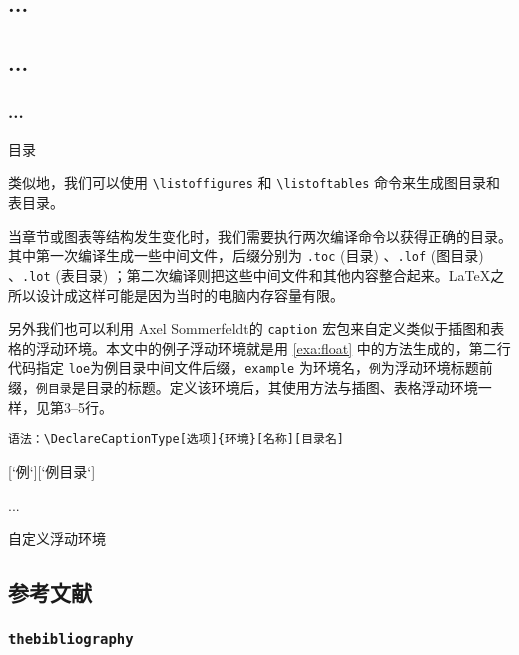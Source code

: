 \begin{example}[!h]
\begin{Code}[]
\tableofcontents
\setcounter{tocdepth}{2}
\chapter*{...}
\section*{...}
\subsection*{...}
\end{Code}
\caption{目录}
\label{exa:toc}
\end{example}

类似地，我们可以使用 \verb|\listoffigures| 和 \verb|\listoftables| 命令来生成图目录和表目录。

当章节或图表等结构发生变化时，我们需要执行两次编译命令以获得正确的目录。其中第一次编译生成一些中间文件，后缀分别为 \texttt{.toc} (目录) 、\texttt{.lof} (图目录) 、\texttt{.lot} (表目录) ；第二次编译则把这些中间文件和其他内容整合起来。\LaTeX 之所以设计成这样可能是因为当时的电脑内存容量有限。

另外我们也可以利用 Axel Sommerfeldt\indexSommerfeldt 的 \texttt{caption} 宏包\citep{Sommerfeldt_2008}来自定义类似于插图和表格的浮动环境。本文中的例子浮动环境就是用 \autoref{exa:float} 中的方法生成的，第二行代码指定 \texttt{loe}为例目录中间文件后缀，\texttt{example} 为环境名，\texttt{例}为浮动环境标题前缀，\texttt{例目录}是目录的标题。定义该环境后，其使用方法与插图、表格浮动环境一样，见第3--5行。

\noindent
\verb|语法：\DeclareCaptionType[选项]{环境}[名称][目录名]|
\begin{example}[h]
\begin{Code}[numbers=none]
[`例`][`例目录`]
\begin{example}[h]
...
\end{example}
\end{Code}
\caption{自定义浮动环境}
\label{exa:float}
\end{example}

\section{参考文献}

\subsection{\texttt{thebibliography}}
\label{sec:thebibliography}

